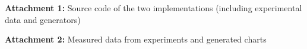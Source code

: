 \documentclass[12pt,a4paper]{report}
\let\openright=\clearpage
\begin{document}



\tableofcontents
















\listoffigures





{\bf Attachment 1:} Source code of the two implementations (including experimental
data and generators)

\bigskip

\noindent
{\bf Attachment 2:} Measured data from experiments and generated charts

\openright
\end{document}
